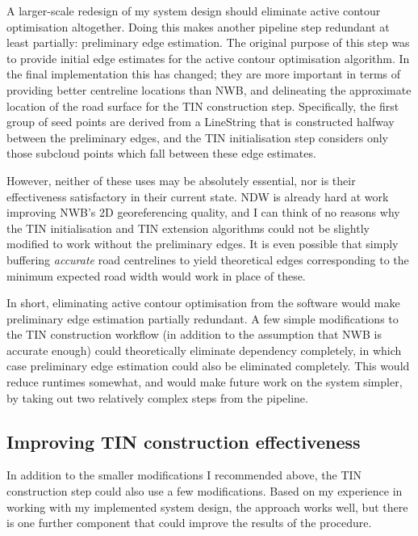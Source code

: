 A larger-scale redesign of my system design should eliminate active contour optimisation altogether. Doing this makes another pipeline step redundant at least partially: preliminary edge estimation. The original purpose of this step was to provide initial edge estimates for the active contour optimisation algorithm. In the final implementation this has changed; they are more important in terms of providing better centreline locations than NWB, and delineating the  approximate location of the road surface for the TIN construction step. Specifically, the first group of seed points are derived from a LineString that is constructed halfway between the preliminary edges, and the TIN initialisation step considers only those subcloud points which fall between these edge estimates.

However, neither of these uses may be absolutely essential, nor is their effectiveness satisfactory in their current state. NDW is already hard at work improving NWB's 2D georeferencing quality, and I can think of no reasons why the TIN initialisation and TIN extension algorithms could not be slightly modified to work without the preliminary edges. It is even possible that simply buffering \textit{accurate} road centrelines to yield theoretical edges corresponding to the minimum expected road width would work in place of these.

In short, eliminating active contour optimisation from the software would make preliminary edge estimation partially redundant. A few simple modifications to the TIN construction workflow (in addition to the assumption that NWB is accurate enough) could theoretically eliminate dependency completely, in which case preliminary edge estimation could also be eliminated completely. This would reduce runtimes somewhat, and would make future work on the system simpler, by taking out two relatively complex steps from the pipeline.

\subsection{Improving TIN construction effectiveness}
\label{sub:improvementstinconstruction}

In addition to the smaller modifications I recommended above, the TIN construction step could also use a few modifications. Based on my experience in working with my implemented system design, the approach works well, but there is one further component that could improve the results of the procedure.

